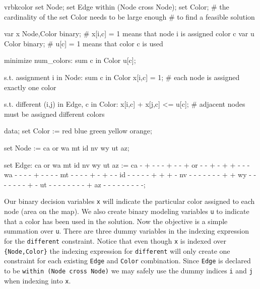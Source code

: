 \begin{SaveVerbatim}{vrbkcolor}
set Node;
set Edge within (Node cross Node);
set Color;   
# the cardinality of the set Color needs to be large enough
# to find a feasible solution

var x {Node,Color} binary; # x[i,c] = 1 means that node i is assigned color c
var u {Color} binary;      # u[c] = 1 means that color c is used

minimize num_colors: sum {c in Color} u[c];

s.t. assignment {i in Node}: sum {c in Color} x[i,c] = 1;
# each node is assigned exactly one color

s.t. different {(i,j) in Edge, c in Color}: x[i,c] + x[j,c] <= u[c];
# adjacent nodes must be assigned different colors

data;
set Color := red blue green yellow orange;

set Node := ca or wa mt id nv wy ut az;

set Edge:
   ca or wa mt id nv wy ut az :=
ca -  +  -  -  -  +  -  -  +
or -  -  +  -  +  +  -  -  -
wa -  -  -  -  +  -  -  -  -
mt -  -  -  -  +  -  +  -  -
id -  -  -  -  -  +  +  +  -
nv -  -  -  -  -  -  -  +  +
wy -  -  -  -  -  -  -  +  -
ut -  -  -  -  -  -  -  -  +
az -  -  -  -  -  -  -  -  -;
\end{SaveVerbatim}

\begin{figure}
\end{figure}

Our binary decision variables \texttt{x} will indicate the particular color 
assigned to each node (area on the map). We also create binary modeling variables
\texttt{u} to indicate that a color has been used in the solution. Now the
objective is a simple summation over \texttt{u}. There are three dummy variables
in the indexing expression for the \texttt{different} constraint. Notice
that even though \texttt{x} is indexed over \texttt{\{Node,Color\}} the
indexing expression for \texttt{different} will only create one constraint for
each existing \texttt{Edge} and \texttt{Color} combination. Since \texttt{Edge}
is declared to be \texttt{within (Node cross Node)} we may safely use the
dummy indices \texttt{i} and \texttt{j} when indexing into \texttt{x}.

